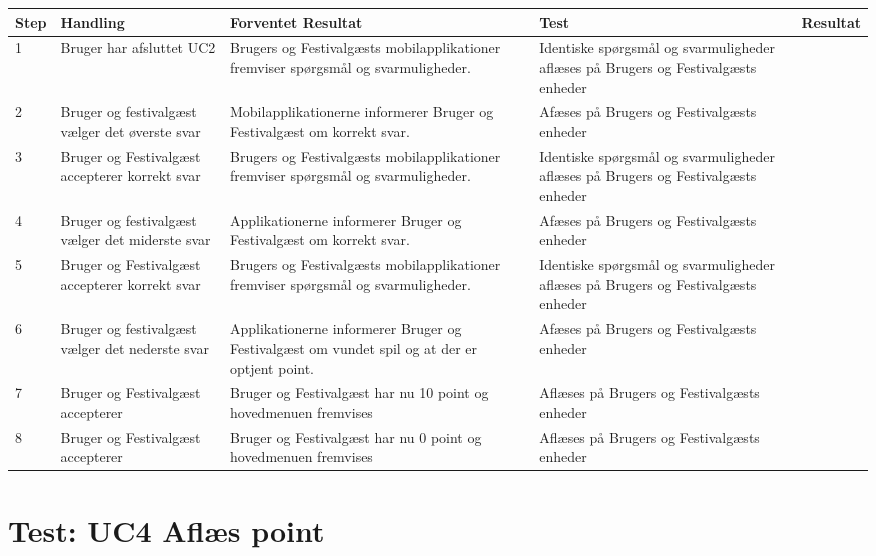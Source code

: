 \begin{longtable}{| p{0.7cm}  | p{3cm}  | p{4cm} |  p{3cm}  | p{3cm}  |}
\hline
Step & Handling & Forventet Resultat & Test & Resultat \\
\hline
1 &  Bruger har afsluttet UC2  &  Brugers og Festivalgæsts mobilapplikationer fremviser spørgsmål og svarmuligheder. & Identiske spørgsmål og svarmuligheder aflæses på Brugers og Festivalgæsts enheder & \FuckingHuge{\checkmark} \\
\hline
2 &  Bruger og festivalgæst vælger det øverste svar &  Mobilapplikationerne informerer Bruger og Festivalgæst om korrekt svar. & Afæses på Brugers og Festivalgæsts enheder & \FuckingHuge{\checkmark} \\ 
\hline
3 &  Bruger og Festivalgæst accepterer korrekt svar  &  Brugers og Festivalgæsts mobilapplikationer fremviser spørgsmål og svarmuligheder. & Identiske spørgsmål og svarmuligheder aflæses på Brugers og Festivalgæsts enheder & \FuckingHuge{\checkmark} \\
\hline
4 &  Bruger og festivalgæst vælger det miderste svar &  Applikationerne informerer Bruger og Festivalgæst om korrekt svar. & Afæses på Brugers og Festivalgæsts enheder & \FuckingHuge{\checkmark} \\ 
\hline
5 &  Bruger og Festivalgæst accepterer korrekt svar  &  Brugers og Festivalgæsts mobilapplikationer fremviser spørgsmål og svarmuligheder. & Identiske spørgsmål og svarmuligheder aflæses på Brugers og Festivalgæsts enheder & \FuckingHuge{\checkmark}  \\
\hline
6 &  Bruger og festivalgæst vælger det nederste svar &  Applikationerne informerer Bruger og Festivalgæst om vundet spil og at der er optjent point. & Afæses på Brugers og Festivalgæsts enheder & \FuckingHuge{\checkmark} \\ 
\hline
7 & Bruger og Festivalgæst accepterer  & Bruger og Festivalgæst har nu 10 point og hovedmenuen fremvises & Aflæses på Brugers og Festivalgæsts enheder & \FuckingHuge{\checkmark} \\
\hline
8 & Bruger og Festivalgæst accepterer  & Bruger og Festivalgæst har nu 0 point og hovedmenuen fremvises & Aflæses på Brugers og Festivalgæsts enheder & \FuckingHuge{\checkmark} \\
\hline
\end{longtable}


\newpage




\section{Test: UC4 Aflæs point}

